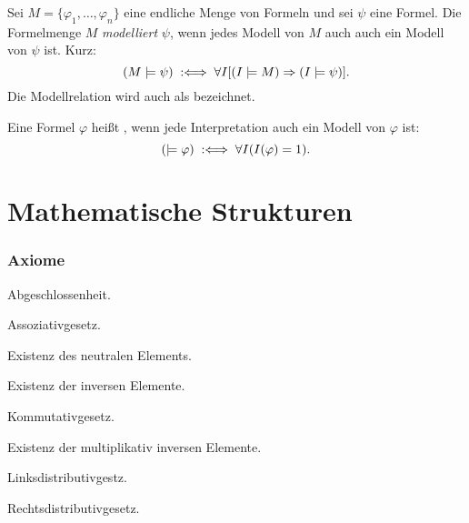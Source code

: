 \begin{definition}[Modellrelation]
Sei $M=\{\varphi_1,\ldots,\varphi_n\}$ eine endliche Menge
von Formeln und sei $\psi$ eine Formel. Die Formelmenge $M$
\emph{modelliert} $\psi$, wenn jedes Modell
von $M$ auch auch ein Modell von $\psi$ ist. Kurz:
\begin{equation}
(M\models\psi) \;:\Longleftrightarrow\; \forall I[(I\models M)\Rightarrow (I\models\psi)].
\end{equation}
Die Modellrelation wird auch als  bezeichnet.
\end{definition}


\begin{definition}[Tautologie]
Eine Formel $\varphi$ heißt ,
wenn jede Interpretation auch ein Modell von $\varphi$ ist:
\begin{equation}
(\models\varphi) \;:\Longleftrightarrow\; \forall I(I(\varphi)=1).
\end{equation}
\end{definition}

\section{Mathematische Strukturen}\label{sec:Strukturen}
\subsubsection*{Axiome}

\noindent{} Abgeschlossenheit.

\noindent{} Assoziativgesetz.

\noindent{} Existenz des neutralen Elements.

\noindent{} Existenz der inversen Elemente.

\noindent{} Kommutativgesetz.

\noindent
{} Existenz der multiplikativ inversen Elemente.

\noindent{} Linksdistributivgestz.

\noindent{} Rechtsdistributivgesetz.

